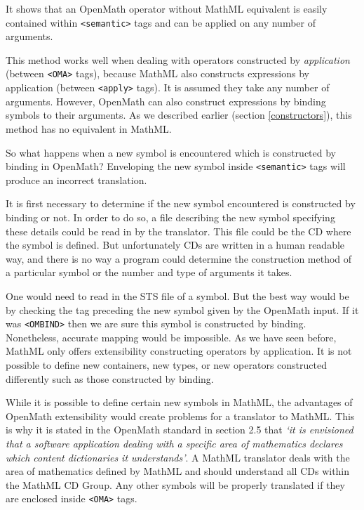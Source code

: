 It shows that an OpenMath operator without MathML equivalent is easily
contained within \verb|<semantic>| tags and can be applied on any
number of arguments.

This method works well when dealing with operators constructed by {\it
application} (between \verb|<OMA>| tags), because MathML also
constructs expressions by application (between \verb|<apply>| tags). It
is assumed they take any number of arguments. However, OpenMath can
also construct expressions by binding symbols to their arguments. As we
described earlier (section \ref{constructors}), this method has no
equivalent in MathML.

So what happens when a new symbol is encountered which is constructed
by binding in OpenMath? Enveloping the new symbol inside
\verb|<semantic>| tags will produce an incorrect translation.

It is first necessary to determine if the new symbol encountered is
constructed by binding or not. In order to do so, a file describing the
new symbol specifying these details could be read in by the translator.
This file could be the CD where the symbol is defined. But
unfortunately CDs are written in a human readable way, and there is no
way a program could determine the construction method of a particular
symbol or the number and type of arguments it takes.

One would need to read in the STS file of a symbol. But the best way
would be by checking the tag preceding the new symbol given by the
OpenMath input. If it was \verb|<OMBIND>| then we are sure this symbol
is constructed by binding. Nonetheless, accurate mapping would be
impossible. As we have seen before, MathML only offers extensibility
constructing operators by application. It is not possible to define new
containers, new types, or new operators constructed differently such as
those constructed by binding.

While it is possible to define certain new symbols in MathML, the
advantages of OpenMath extensibility would create problems for a
translator to MathML. This is why it is stated in the OpenMath standard
in section 2.5 that {\it `it is envisioned that a software application
dealing with a specific area of mathematics declares which content
dictionaries it understands'}. A MathML
translator deals with the area of mathematics defined by MathML and
should understand all CDs within the MathML CD Group. Any other symbols
will be properly translated if they are enclosed inside \verb|<OMA>|
tags.

